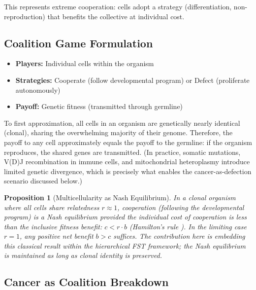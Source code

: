 \documentclass[12pt,a4paper]{article}
\newtheorem{proposition}{Proposition}
\theoremstyle{remark}
\begin{document}
This represents extreme cooperation: cells adopt a strategy (differentiation, non-reproduction) that benefits the collective at individual cost.

\subsection{Coalition Game Formulation}

\begin{itemize}
    \item \textbf{Players:} Individual cells within the organism
    \item \textbf{Strategies:} Cooperate (follow developmental program) or Defect (proliferate autonomously)
    \item \textbf{Payoff:} Genetic fitness (transmitted through germline)
\end{itemize}

To first approximation, all cells in an organism are genetically nearly identical (clonal), sharing the overwhelming majority of their genome. Therefore, the payoff to any cell approximately equals the payoff to the germline: if the organism reproduces, the shared genes are transmitted. (In practice, somatic mutations, V(D)J recombination in immune cells, and mitochondrial heteroplasmy introduce limited genetic divergence, which is precisely what enables the cancer-as-defection scenario discussed below.)

\begin{proposition}[Multicellularity as Nash Equilibrium]
\label{prop:multicellularity}
In a clonal organism where all cells share relatedness $r \approx 1$, cooperation (following the developmental program) is a Nash equilibrium provided the individual cost of cooperation is less than the inclusive fitness benefit: $c < r \cdot b$ (Hamilton's rule \citep{Hamilton1964}). In the limiting case $r = 1$, any positive net benefit $b > c$ suffices. The contribution here is embedding this classical result within the hierarchical FST framework; the Nash equilibrium is maintained as long as clonal identity is preserved.
\end{proposition}

\subsection{Cancer as Coalition Breakdown}
\end{document}

